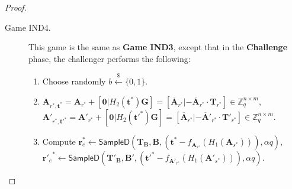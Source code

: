 \documentclass[a4paper,11pt,onecolumn]{elsarticle}
\begin{document}
\begin{proof}
\begin{description}
			  \item[Game IND4.] This game is the same as \textbf{Game IND3}, except that  in the \textbf{Challenge} phase, the challenger performs the following:
			  	\begin{enumerate}
			
			  \item Choose randomly $b \xleftarrow{\$} \{0,1\}$.

			\item $\mathbf{A}_{r^*,\textbf{t}^*}=\mathbf{A}_{r^*}+[\textbf{0}|H_2(\textbf{t}^*)\mathbf{G}]=[\overline{\mathbf{A}}_{r^*}|-\overline{\mathbf{A}}_{r^*}\cdot \mathbf{T}_{r^*}] \in \mathbb{Z}_q^{n \times m}$,\\ $\mathbf{A}'_{r^*,\textbf{t}'^*}=\mathbf{A}'_{r^*}+[\textbf{0}|H_2(\textbf{t}'^*)\mathbf{G}]=[\overline{\mathbf{A}}_{r^*}|-\overline{\mathbf{A}}'_{r^*}\cdot \mathbf{T}'_{r^*}] \in \mathbb{Z}_q^{n \times m}$.
		\item Compute $\textbf{r}_e^* \leftarrow \textsf{SampleD}(\textbf{T}_\textbf{B}, \textbf{B}, (\textbf{t}^*-f_{\overline{\textbf{A}}_{r^*}}(H_1(\textbf{A}_{s^*}))),\alpha q)$,  ${\textbf{r}'_e}^* \leftarrow \textsf{SampleD}(\textbf{T}'_\textbf{B}, \textbf{B}', (\textbf{t}'^*-f_{\overline{\textbf{A}}'_{r^*}}(H_1(\textbf{A}'_{s^*}))),\alpha q)$. 		 
	

\end{enumerate}
\end{description}
\end{proof}
\end{document}
